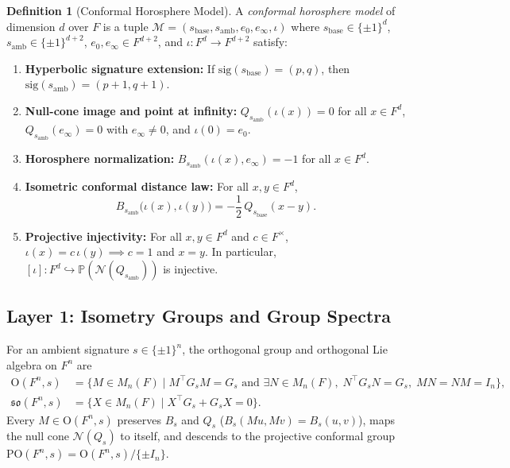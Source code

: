\documentclass[11pt]{article}
\theoremstyle{definition}
\newtheorem{definition}[theorem]{Definition}
\newcommand{\Orth}{\mathrm{O}}
\newcommand{\POrth}{\mathrm{PO}}
\newcommand{\so}{\mathfrak{so}}
\newcommand{\sig}{\mathrm{sig}}
\begin{document}
\begin{definition}[Conformal Horosphere Model]\label{def:conformal-model}
A \emph{conformal horosphere model} of dimension $d$ over $F$ is a tuple $\mathcal{M} = (s_{\mathrm{base}}, s_{\mathrm{amb}}, e_0, e_\infty, \iota)$ where $s_{\mathrm{base}} \in \{\pm 1\}^d$, $s_{\mathrm{amb}} \in \{\pm 1\}^{d+2}$, $e_0, e_\infty \in F^{d+2}$, and $\iota : F^d \to F^{d+2}$ satisfy:
\begin{enumerate}
  \item \textbf{Hyperbolic signature extension:} If $\sig(s_{\mathrm{base}}) = (p, q)$, then $\sig(s_{\mathrm{amb}}) = (p + 1, q + 1)$.
  \item \textbf{Null-cone image and point at infinity:} $Q_{s_{\mathrm{amb}}}(\iota(x)) = 0$ for all $x \in F^d$, $Q_{s_{\mathrm{amb}}}(e_\infty) = 0$ with $e_\infty \neq 0$, and $\iota(0) = e_0$.
  \item \textbf{Horosphere normalization:} $B_{s_{\mathrm{amb}}}(\iota(x), e_\infty) = -1$ for all $x \in F^d$.
  \item \textbf{Isometric conformal distance law:} For all $x, y \in F^d$,
  \begin{equation}\label{eq:metric-law}
    B_{s_{\mathrm{amb}}}\bigl(\iota(x), \iota(y)\bigr) = -\frac{1}{2}\, Q_{s_{\mathrm{base}}}(x - y).
  \end{equation}
  \item \textbf{Projective injectivity:} For all $x, y \in F^d$ and $c \in F^\times$, $\iota(x) = c\,\iota(y) \implies c = 1$ and $x = y$. In particular, $[\iota] : F^d \hookrightarrow \mathbb{P}(\mathcal{N}(Q_{s_{\mathrm{amb}}}))$ is injective.
\end{enumerate}
\end{definition}

\subsection{Layer 1: Isometry Groups and Group Spectra}

For an ambient signature $s \in \{\pm 1\}^n$, the orthogonal group and orthogonal Lie algebra on $F^n$ are
\begin{align*}
  \Orth(F^n, s) &= \bigl\{ M \in M_n(F) \;\big|\; M^\top G_s M = G_s \text{ and } \exists N \in M_n(F),\; N^\top G_s N = G_s,\; MN = NM = I_n \bigr\}, \\
  \so(F^n, s) &= \bigl\{ X \in M_n(F) \;\big|\; X^\top G_s + G_s X = 0 \bigr\}.
\end{align*}
Every $M \in \Orth(F^n, s)$ preserves $B_s$ and $Q_s$ ($B_s(Mu, Mv) = B_s(u, v)$), maps the null cone $\mathcal{N}(Q_s)$ to itself, and descends to the projective conformal group $\POrth(F^n, s) = \Orth(F^n, s)/\{\pm I_n\}$.
\end{document}
